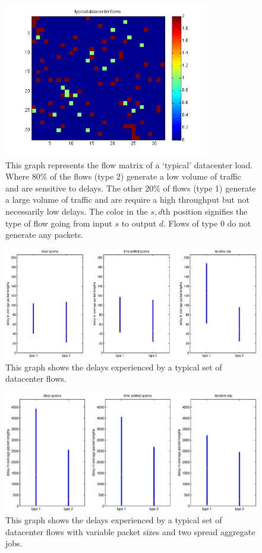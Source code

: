 \documentclass[11pt]{article}%
\begin{document}
\begin{figure}%
	 \includegraphics[width=90mm]{typ_vs_flows.png}
	\caption{This graph represents the flow matrix of a `typical' datacenter load.  Where $80\%$ of the flows (type 2) generate a low volume of traffic and are sensitive to delays.  The other $20\%$ of flows (type 1) generate a large volume of traffic and are require a high throughput but not necessarily low delays.  The color in the $s,d$th position signifies the type of flow going from input $s$ to output $d$.  Flows of type $0$ do not generate any packets.} 	
	\label{typical_flows}
\end{figure}


\begin{figure}%
	 \includegraphics[width=\textwidth]{typ_vs.eps}
	\caption{This graph shows the delays experienced by a typical set of datacenter flows.}
	\label{typ_vs}
\end{figure}

\begin{figure}%
	 \includegraphics[width=\textwidth]{typ_spread_vs.eps}
	\caption{This graph shows the delays experienced by a typical set of datacenter flows with variable packet sizes and two spread aggregate jobs.}
	\label{typ_spread_vs}
\end{figure}
\end{document}
